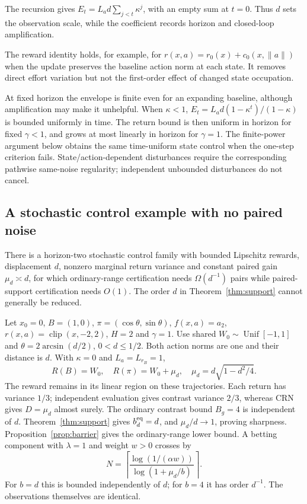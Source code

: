 \documentclass[twocolumn,nameyear]{autart}
\begin{document}
The recursion gives $E_t=L_ad\sum_{j<t}\kappa^j$, with an empty
sum at $t=0$. Thus $d$ sets the observation scale, while the coefficient
records horizon and closed-loop amplification.

The reward identity holds, for example, for
$r(x,a)=r_0(x)+c_0(x,\|a\|)$ when the update preserves the baseline
action norm at each state. It removes direct effort variation but not
the first-order effect of changed state occupation.

At fixed horizon the envelope is finite even for an expanding baseline,
although amplification may make it unhelpful. When $\kappa<1$,
$E_t=L_ad(1-\kappa^t)/(1-\kappa)$ is bounded uniformly in time.
The return bound is then uniform in horizon for fixed $\gamma<1$,
and grows at most linearly in horizon for $\gamma=1$. The finite-power
argument below obtains the same time-uniform state control when the
one-step criterion fails.
State/action-dependent disturbances require the corresponding pathwise
same-noise regularity; independent unbounded disturbances do not cancel.

\subsection{A stochastic control example with no paired noise}
\begin{cor}\label{cor:sharp}
There is a horizon-two stochastic control family with bounded Lipschitz
rewards, displacement $d$, nonzero marginal return variance and constant
paired gain $\mu_d\asymp d$, for which ordinary-range certification needs
$\Omega(d^{-1})$ pairs while paired-support certification needs $O(1)$.
The order $d$ in Theorem~\ref{thm:support} cannot generally be reduced.
\end{cor}
\begin{pf}
Let $x_0=0$, $B=(1,0)$, $\pi=(\cos\theta,\sin\theta)$,
$f(x,a)=a_2$, $r(x,a)=\operatorname{clip}(x,-2,2)$, $H=2$ and
$\gamma=1$. Use shared $W_0\sim\operatorname{Unif}[-1,1]$ and
$\theta=2\arcsin(d/2)$, $0<d\le1/2$. Both action norms are one and
their distance is $d$. With $\kappa=0$ and $L_a=L_{r_B}=1$,
\begin{equation}\label{eq:sharp-example}
 R(B)=W_0,\quad R(\pi)=W_0+\mu_d,
 \quad \mu_d=d\sqrt{1-d^2/4}.
\end{equation}
The reward remains in its linear region on these trajectories. Each
return has variance $1/3$; independent evaluation gives contrast
variance $2/3$, whereas CRN gives $D=\mu_d$ almost surely.
The ordinary contrast bound $B_g=4$ is independent of $d$.
Theorem~\ref{thm:support} gives $b_d^{\rm eq}=d$, and
$\mu_d/d\to1$, proving sharpness. Proposition~\ref{prop:barrier}
gives the ordinary-range lower bound. A betting component with
$\lambda=1$ and weight $w>0$ crosses by
\[
 N=\left\lceil\frac{\log(1/(\alpha w))}
                          {\log(1+\mu_d/b)}\right\rceil.
\]
For $b=d$ this is bounded independently of $d$; for $b=4$ it has order
$d^{-1}$. The observations themselves are identical.
\end{pf}
\end{document}

